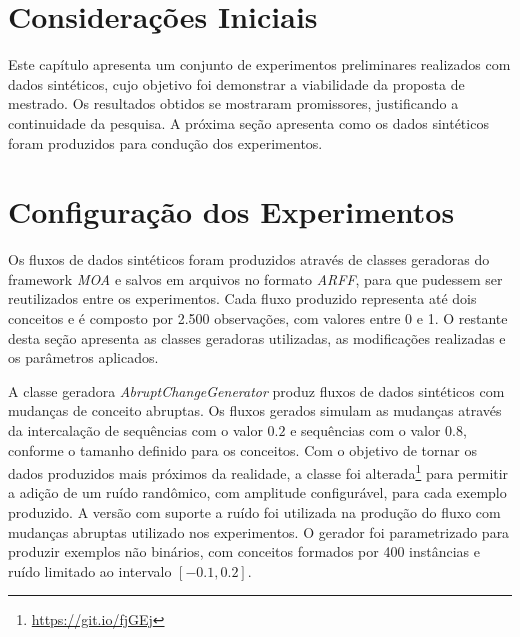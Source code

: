 \documentclass[qual, classic, a4paper]{ufbathesis}
\begin{document}
 \label{experimentos_iniciais}
\section{Considerações Iniciais}

Este capítulo apresenta um conjunto de experimentos preliminares realizados com dados sintéticos, cujo objetivo foi demonstrar a viabilidade da proposta de mestrado.
%
Os resultados obtidos se mostraram promissores, justificando a continuidade da pesquisa.
%
A próxima seção apresenta como os dados sintéticos foram produzidos para condução dos experimentos.

\section{Configuração dos Experimentos}
\label{sec:configuracao_experimentos}

Os fluxos de dados sintéticos foram produzidos através de classes geradoras do framework \textit{MOA} e salvos em arquivos no formato \textit{ARFF}, para que pudessem ser reutilizados entre os experimentos.
Cada fluxo produzido representa até dois conceitos e é composto por 2.500 observações, com valores entre 0 e 1.
O restante desta seção apresenta as classes geradoras utilizadas, as modificações realizadas e os parâmetros aplicados.

A classe geradora \textit{AbruptChangeGenerator} produz fluxos de dados sintéticos com mudanças de conceito abruptas.
Os fluxos gerados simulam as mudanças através da intercalação de sequências com o valor $0.2$ e sequências com o valor $0.8$, conforme o tamanho definido para os conceitos.
Com o objetivo de tornar os dados produzidos mais próximos da realidade, a classe foi alterada\footnote{\url{https://git.io/fjGEj}} para permitir a adição de um ruído randômico, com amplitude configurável, para cada exemplo produzido.
A versão com suporte a ruído foi utilizada na produção do fluxo com mudanças abruptas utilizado nos experimentos.
O gerador foi parametrizado para produzir exemplos não binários, com conceitos formados por 400 instâncias e ruído limitado ao intervalo $[-0.1, 0.2]$.


\end{document}
